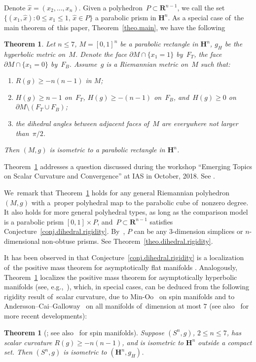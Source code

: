 \documentclass[10pt,a4paper]{amsart}
\numberwithin{equation}{section}
\newtheorem{theo}[prop]{Theorem}
\theoremstyle{definition}
\newcommand{\HH}{\mathbf{H}}
\newcommand{\RR}{\mathbf{R}}
\begin{document}
Denote $\hat{x}=(x_2,\dots,x_n)$. Given a polyhedron~$P\subset \RR^{n-1}$, we call the set $\{(x_1,\hat{x})\colon 0\le x_1\le 1,\, \hat{x}\in P\}$ a parabolic prism in $\HH^n$. As a special case of~the main theorem of~this paper, Theorem~\ref{theo.main}, we have the following
\begin{theo}\label{theo.parabolic.cube}
Let $n\le 7$, $M=[0,1]^n$ be a parabolic rectangle in $\HH^n$, $g_H$ be the hyperbolic metric on~$M$. Denote the face $\partial M\cap \{x_1=1\}$ by~$F_T$, the face $\partial M\cap \{x_1=0\}$ by~$F_B$. Assume~$g$ is a Riemannian metric on~$M$ such that:
\begin{enumerate}\itemsep=0pt
\item[${\rm 1)}$] $R(g)\ge -n(n-1)$ in $M$;
\item[${\rm 2)}$] $H(g)\ge n-1$ on~$F_T$, $H(g)\ge -(n-1)$ on~$F_B$, and~$H(g)\ge 0$ on~$\partial M\setminus (F_T\cup F_B)$;
\item[${\rm 3)}$] the dihedral angles between adjacent faces of~$M$ are everywhere not larger than~$\pi/2$.
\end{enumerate}
Then $(M,g)$ is isometric to a parabolic rectangle in $\HH^n$.
\end{theo}

Theorem~\ref{theo.parabolic.cube} addresses a question discussed during the workshop ``Emerging Topics on Scalar Curvature and Convergence'' at IAS in October, 2018. See \cite[Section~6]{gromov2018IAS}.

We~remark that Theorem~\ref{theo.parabolic.cube} holds for any general Riemannian polyhedron~$(M,g)$ with a~proper polyhedral map to the parabolic cube of~nonzero degree. It also holds for more general polyhedral types, as long as the comparison model is a parabolic prism $[0,1]\times P$, and~$P\subset \RR^{n-1}$ satisfies Conjecture~\ref{conj.dihedral.rigidity}. By~\cite{Li2017polyhedron,li2019dihedral}, $P$ can be any $3$-dimension simplices or $n$-dimensional non-obtuse prisms. See Theorem~\ref{theo.dihedral.rigidity}.

It has been observed in \cite[Section~5]{li2019dihedral} that Conjecture~\ref{conj.dihedral.rigidity} is a localization of~the positive mass theorem for asymptotically flat manifolds \cite{SchoenYau1979ProofPositiveMass,Witten1981newproof}. Analogously, Theorem~\ref{theo.parabolic.cube} localizes the positive mass theorem for asymptotically hyperbolic manifolds (see, e.g.,~\cite{chruscielHerzlich2003mass,ChruscielNagy2001mass,Wang2001mass}), which, in special cases, can be deduced from the following rigidity result of~scalar curvature, due to Min-Oo~\cite{Minoo1989rigidity} on spin manifolds and to Andersson--Cai--Galloway~\cite{AnderssonCaiGalloway2008rigidity} on all manifolds of~dimension at most $7$ (see also~\cite{chruciel2019hyperbolic,HuangJangMartin2020mass} for more recent developments):
\begin{theo}[\cite{AnderssonCaiGalloway2008rigidity}; see also~\cite{Minoo1989rigidity} for spin manifolds]\label{theo.R.rigidity.hyperbolic}
Suppose $(S^n,g)$, $2\le n\le 7$, has scalar curvature $R(g)\ge -n(n-1)$, and is isometric to $\HH^n$ outside a compact set. Then $(S^n,g)$ is isometric to $(\HH^n, g_H)$.
\end{theo}
\end{document}
